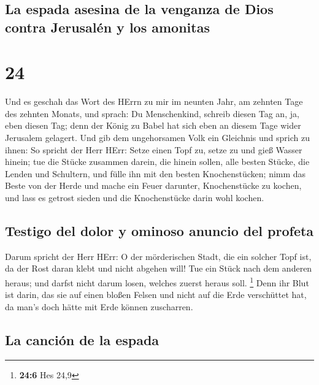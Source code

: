 \hypertarget{la-espada-asesina-de-la-venganza-de-dios-contra-jerusaluxe9n-y-los-amonitas}{%
\subsection{La espada asesina de la venganza de Dios contra Jerusalén y
los
amonitas}\label{la-espada-asesina-de-la-venganza-de-dios-contra-jerusaluxe9n-y-los-amonitas}}

\hypertarget{section-23}{%
\section{24}\label{section-23}}

 Und es geschah das Wort des HErrn zu mir im neunten Jahr,
am zehnten Tage des zehnten Monats, und sprach:  Du
Menschenkind, schreib diesen Tag an, ja, eben diesen Tag; denn der König
zu Babel hat sich eben an diesem Tage wider Jerusalem gelagert.
 Und gib dem ungehorsamen Volk ein Gleichnis und sprich zu
ihnen: So spricht der Herr HErr: Setze einen Topf zu, setze zu und gieß
Wasser hinein;  tue die Stücke zusammen darein, die hinein
sollen, alle besten Stücke, die Lenden und Schultern, und fülle ihn mit
den besten Knochenstücken;  nimm das Beste von der Herde
und mache ein Feuer darunter, Knochenstücke zu kochen, und lass es
getrost sieden und die Knochenstücke darin wohl kochen.

\hypertarget{testigo-del-dolor-y-ominoso-anuncio-del-profeta}{%
\subsection{Testigo del dolor y ominoso anuncio del
profeta}\label{testigo-del-dolor-y-ominoso-anuncio-del-profeta}}

 Darum spricht der Herr HErr: O der mörderischen Stadt,
die ein solcher Topf ist, da der Rost daran klebt und nicht abgehen
will! Tue ein Stück nach dem anderen heraus; und darfst nicht darum
losen, welches zuerst heraus soll. \footnote{\textbf{24:6} Hes 24,9}
 Denn ihr Blut ist darin, das sie auf einen bloßen Felsen
und nicht auf die Erde verschüttet hat, da man's doch hätte mit Erde
können zuscharren.

\hypertarget{la-canciuxf3n-de-la-espada}{%
\subsection{La canción de la espada}\label{la-canciuxf3n-de-la-espada}}

